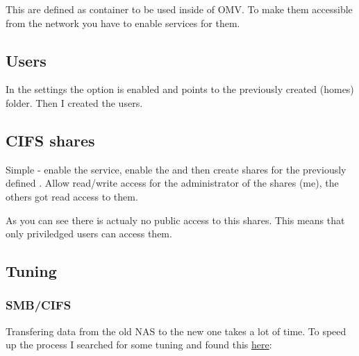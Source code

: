 
This  are defined as container to be used inside
of \gls{OMV}. To make them accessible from the network you have to enable
services for them.

\subsection{Users}

In the settings the option  is enabled and
points to the previously created \tsTextMonospace(homes) folder. Then I created
the users.


\subsection{CIFS shares}

Simple - enable the  service, enable the  and then create shares for the previously defined . Allow read/write access for the administrator of the shares (me),
the others got read access to them.



As you can see there is actualy no public access to this shares. This means
that only priviledged users can access them.

\subsection{Tuning}

\subsubsection{SMB/CIFS}

Transfering data from the old \gls{NAS} to the new one takes a lot of time. To
speed up the process I searched for some tuning and found this
\href{https://techie-show.com/open-media-vault-smb-performance-quick-win/}{here}:

